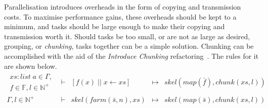 \documentclass[final]{jfp1}
\newcommand{\f}[0]{\bar{f}}
\newcommand{\s}[0]{\bar{s}}
\newcommand{\blf}[0]{\mathbb{F}}
\newcommand{\bn}[0]{\mathbb{N}}
\newcommand{\bnp}[0]{\bn^{+}}
\newcommand{\type}[3]{#1: #2\; #3}
\newcommand{\ing}[1]{#1 \in{} \Gamma}
\newcommand{\rewrite}[3]{#1 & \vdash{} & #2 & \mapsto{} & #3}
\begin{document}
Parallelisation introduces overheads in the form of copying and transmission
costs. To maximise performance gains, these overheads should be kept to a
minimum, and tasks should be large enough to make their copying and transmission worth it.
Should tasks be too small, or are not as large as desired, grouping, or
\emph{chunking}, tasks together can be a simple solution. Chunking can be
accomplished with the aid of the \emph{Introduce Chunking} refactoring~\cite{hlpp}. The
rules for it are shown below.
% 
\[
  \begin{array}{rclcl}
    \rewrite{
    \begin{array}{r}
      \ing{\type{xs}{list}{a}}, \\
      f \in \blf, l \in \bnp
    \end{array}
    }
    {[f(x)\; ||\; x \leftarrow xs]}{skel(map(\f), chunk(xs, l))} \\[2ex]
    \rewrite{\Gamma, l \in \bnp}
    {skel(farm(\s, n), xs)}{skel(map(\s), chunk(xs, l))} \\
  \end{array}
\]
% 
% 
\end{document}
